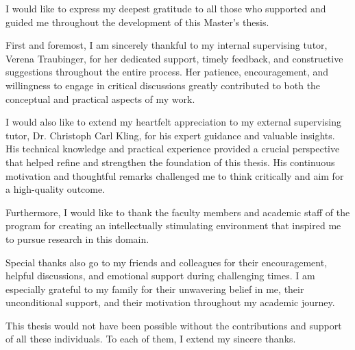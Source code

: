 I would like to express my deepest gratitude to all those who supported and guided me throughout the development of this Master's thesis.

First and foremost, I am sincerely thankful to my internal supervising tutor, Verena Traubinger, for her dedicated support, timely feedback, and constructive suggestions throughout the entire process. Her patience, encouragement, and willingness to engage in critical discussions greatly contributed to both the conceptual and practical aspects of my work.

I would also like to extend my heartfelt appreciation to my external supervising tutor, Dr. Christoph Carl Kling, for his expert guidance and valuable insights. His technical knowledge and practical experience provided a crucial perspective that helped refine and strengthen the foundation of this thesis. His continuous motivation and thoughtful remarks challenged me to think critically and aim for a high-quality outcome.

Furthermore, I would like to thank the faculty members and academic staff of the program for creating an intellectually stimulating environment that inspired me to pursue research in this domain.

Special thanks also go to my friends and colleagues for their encouragement, helpful discussions, and emotional support during challenging times. I am especially grateful to my family for their unwavering belief in me, their unconditional support, and their motivation throughout my academic journey.

This thesis would not have been possible without the contributions and support of all these individuals. To each of them, I extend my sincere thanks.
